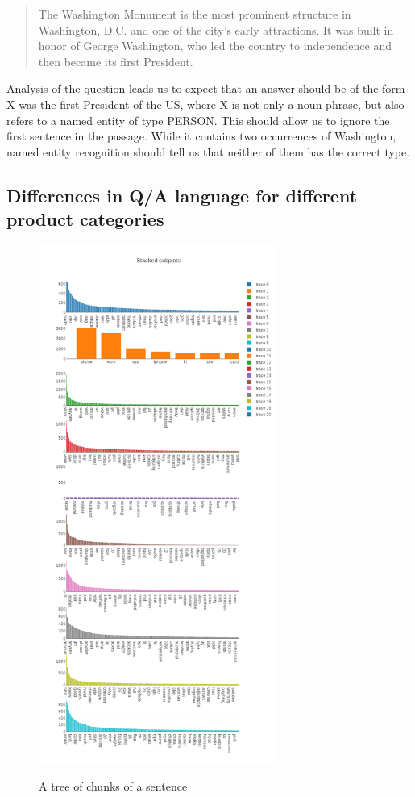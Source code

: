\documentclass[LaM,binding=0.6cm]{sapthesis}
\begin{document}
\begin{quote}
The Washington Monument is the most prominent structure in Washington, D.C. and one of the city's early attractions. It was built in honor of George Washington, who led the country to independence and then became its first President.
\end{quote}

Analysis of the question leads us to expect that an answer should be of the form X was the first President of the US, where X is not only a noun phrase, but also refers to a named entity of type PERSON. This should allow us to ignore the first sentence in the passage. While it contains two occurrences of Washington, named entity recognition should tell us that neither of them has the correct type.


\subsection{Differences in Q/A language for different product categories}

\begin{figure}
\centering
\includegraphics[width=0.7\textwidth]{pictures/words0.png}\\[3ex]
\caption{A tree of chunks of a sentence}
\label{fig:chunktree}
\end{figure}
\end{document}

